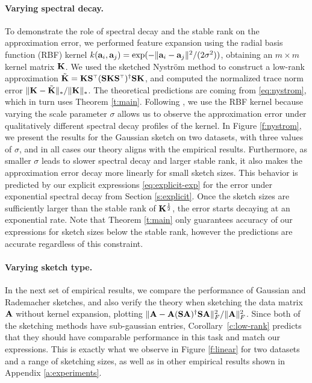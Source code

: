 \documentclass{article}
\begin{document}
\paragraph{Varying spectral decay.}  To demonstrate the role of spectral
decay and the stable rank on the approximation error, we performed
feature expansion using the radial basis function (RBF) kernel
$k(\mathbf a_i,\mathbf a_j)=\exp(-\|\mathbf a_i-\mathbf a_j\|^2/(2\sigma^2))$, obtaining an $m\times m$
kernel matrix $\mathbf K$. We used the sketched Nystr\"om method to construct
a low-rank approximation $\tilde
\K=\K\S^\top(\S\K\S^\top)^\dagger\S\K$, and computed the normalized trace norm 
error $\|\mathbf K-\tilde{\mathbf K}\|_*/\|\mathbf K\|_*$. The theoretical predictions are coming from
\eqref{eq:nystrom}, which in turn uses Theorem \ref{t:main}.
Following \cite{revisiting-nystrom}, we use the RBF kernel because
varying the scale parameter $\sigma$ 
allows us to observe the approximation error under qualitatively
different spectral decay profiles of the kernel. In Figure \ref{f:nystrom},
we present the results for the Gaussian sketch on two datasets, with three values
of $\sigma$, and in all cases our theory aligns with the empirical
results. Furthermore, as smaller $\sigma$ leads to slower spectral decay and 
larger stable rank, it also makes the approximation error decay more
linearly for small sketch sizes. This behavior is predicted by our explicit
expressions \eqref{eq:explicit-exp} for the error under exponential spectral decay from
Section \ref{s:explicit}. Once the sketch sizes are sufficiently
larger than the stable rank of $\mathbf K^{\frac12}$, the error starts decaying at an
exponential rate. Note that Theorem \ref{t:main} only guarantees
accuracy of our expressions for sketch sizes below the stable rank,
however the predictions are accurate regardless of this constraint.
\vspace{-2mm}
\paragraph{Varying sketch type.} In the next set of
empirical results, we compare the performance of Gaussian and Rademacher
sketches, and also verify the theory when sketching the data matrix $\mathbf A$
without kernel expansion, plotting
$\|\mathbf A-\mathbf A(\mathbf{S}\mathbf A)^\dagger\mathbf{S}\mathbf A\|_F^2/\|\mathbf A\|_F^2$.
Since both of the sketching methods have 
sub-gaussian entries, Corollary~\ref{c:low-rank} predicts that they
should have comparable performance in this task and match our
expressions. This is exactly what we observe in Figure \ref{f:linear}
for two datasets and a range of sketching sizes, as well as in other
empirical results shown in Appendix \ref{a:experiments}.
\end{document}
